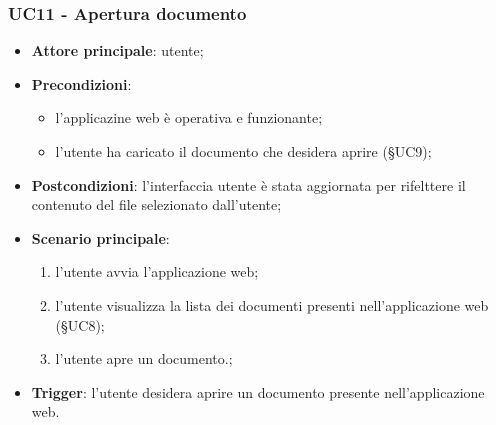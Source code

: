 \documentclass[10pt, a4paper]{article}
\begin{document}
    \subsubsection{UC11 - Apertura documento} 
    \begin{itemize}
        \item \textbf{Attore principale}: utente;
        \item \textbf{Precondizioni}: 
        \begin{itemize}
            \item l'applicazine web è operativa e funzionante;
            \item l'utente ha caricato il documento che desidera aprire (\S UC9);
        \end{itemize}
        \item \textbf{Postcondizioni}: l'interfaccia utente è stata aggiornata per rifelttere il contenuto del file selezionato dall'utente;
        \item \textbf{Scenario principale}:
            \begin{enumerate}
                \item l'utente avvia l'applicazione web;
                \item l'utente visualizza la lista dei documenti presenti nell'applicazione web (\S UC8);
                \item l'utente apre un documento.;
            \end{enumerate}
        \item \textbf{Trigger}: l'utente desidera aprire un documento presente nell'applicazione web.
    \end{itemize}
\end{document}
